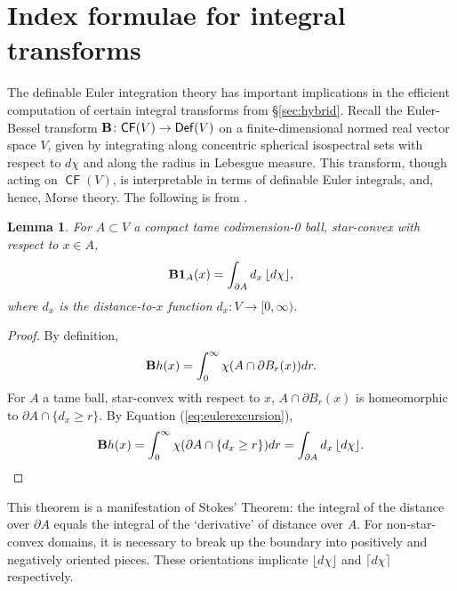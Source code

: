 \documentclass{psapm-l}
\newtheorem{lemma}[theorem]{Lemma}
\theoremstyle{definition}
\theoremstyle{remark}
\numberwithin{equation}{section}
\begin{document}
\section{Index formulae for integral transforms}
\label{sec:index}

The definable Euler integration theory has important implications in the efficient computation of certain integral transforms from \S\ref{sec:hybrid}. Recall the Euler-Bessel transform ${{\bf B}}\colon{{{\operatorname{\mathsf{{CF}}}}}}(V)\to{{{\operatorname{\mathsf{{Def}}}}}}(V)$ on a finite-dimensional normed real vector space $V$,  given by integrating along concentric spherical isospectral sets with respect to $d\chi$ and along the radius in Lebesgue measure. This transform, though acting on ${{{\operatorname{\mathsf{{CF}}}}}}(V)$, is interpretable in terms of definable Euler integrals, and, hence, Morse theory. The following is from \cite{GR}.

\begin{lemma}
\label{lem:cone}
For $A\subset V$ a compact tame codimension-0 ball, star-convex with respect to $x\in A$,
\begin{equation}
    {{\bf B}}{{\mathbf{1}}}_A(x) = \int_{{\partial} A}d_x\,{{\lfloor d\chi\rfloor}} ,
\end{equation}
where $d_x$ is the distance-to-$x$ function $d_x:V\to[0,\infty)$.
\end{lemma}
\begin{proof}
By definition,
\[
            {{\bf B}} h (x) = \int_0^\infty \chi(A\cap {\partial} B_r(x)) dr .
\]
For $A$ a tame ball, star-convex with respect to $x$, $A\cap {\partial} B_r(x)$ is homeomorphic to ${\partial} A\cap\{d_x\geq r\}$. By Equation (\ref{eq:eulerexcursion}),
\[
            {{\bf B}} h (x) = \int_0^\infty \chi({\partial} A\cap\{d_x\geq r\})dr = \int_{{\partial} A} d_x\,{{\lfloor d\chi\rfloor}} .
\]
\end{proof}

This theorem is a manifestation of Stokes' Theorem: the integral of the distance over ${\partial} A$ equals the integral of the `derivative' of distance over $A$. For non-star-convex domains, it is necessary to break up the boundary into positively and negatively oriented pieces. These orientations implicate ${{\lfloor d\chi\rfloor}}$ and ${{\lceil d\chi\rceil}}$ respectively.
\end{document}
